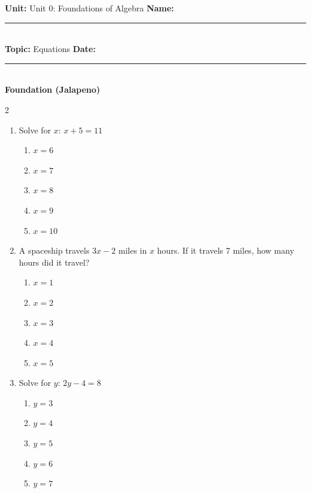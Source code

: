 \documentclass[10pt]{article}
\begin{document}
\enlargethispage{2.5cm}

\begin{tcolorbox}[colback=mainblue!5, colframe=mainblue, sharp corners, boxrule=0.5pt]
    \small \textbf{Unit:} Unit 0: Foundations of Algebra \hfill \textbf{Name:} \rule{3cm}{0.4pt} \\
    \small \textbf{Topic:} Equations \hfill \textbf{Date:} \rule{2cm}{0.4pt} \\
    \centering \textbf{\large Foundation (Jalapeno)}
\end{tcolorbox}

\vspace{0.2cm}

\begin{multicols}{2}
\begin{enumerate}[label=\textbf{Q\arabic*.}, leftmargin=*, itemsep=6pt, parsep=0pt]

  \item \small Solve for $x$: $x + 5 = 11$
  \begin{enumerate}[label=(\Alph*), leftmargin=0.6cm, nosep, itemsep=2pt]
    \item $x = 6$
    \item $x = 7$
    \item $x = 8$
    \item $x = 9$
    \item $x = 10$
  \end{enumerate}

  \item \small A spaceship travels $3x - 2$ miles in $x$ hours. If it travels 7 miles, how many hours did it travel?
  \begin{enumerate}[label=(\Alph*), leftmargin=0.6cm, nosep, itemsep=2pt]
    \item $x = 1$
    \item $x = 2$
    \item $x = 3$
    \item $x = 4$
    \item $x = 5$
  \end{enumerate}

  \item \small Solve for $y$: $2y - 4 = 8$
  \begin{enumerate}[label=(\Alph*), leftmargin=0.6cm, nosep, itemsep=2pt]
    \item $y = 3$
    \item $y = 4$
    \item $y = 5$
    \item $y = 6$
    \item $y = 7$
  \end{enumerate}


\end{enumerate}
\end{multicols}
\end{document}
